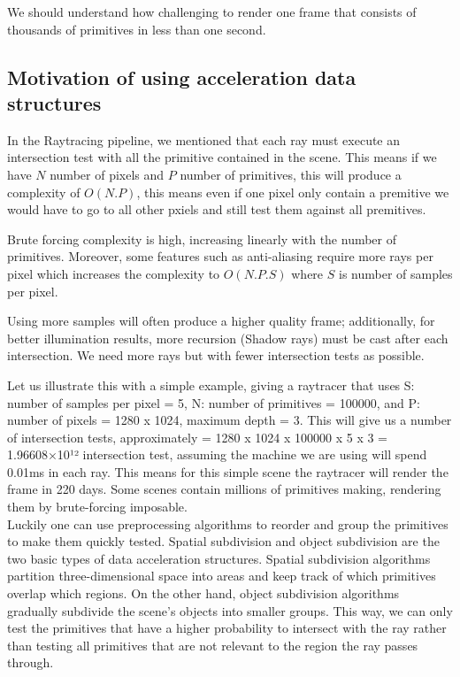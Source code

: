 \documentclass[11pt,a4paper]{article}
\begin{document}
We should understand how challenging to render one frame that consists of thousands of primitives in less than one second. 

\subsection{Motivation of using acceleration data structures}
In the Raytracing pipeline, we mentioned that each ray must execute an intersection test with all the primitive contained in the scene.  This means if we have $N$ number of pixels and $P$ number of primitives, this will produce a complexity of $O(N.P)$, this means even if one pixel only contain a premitive we would have to go to all other pxiels and still test them against all premitives. 

Brute forcing complexity is high, increasing linearly with the number of primitives. Moreover, some features such as anti-aliasing require more rays per pixel which increases the complexity to  $O(N.P.S)$ where $S$ is number of samples per pixel. 

Using more samples will often produce a higher quality frame; additionally, for better illumination results, more recursion (Shadow rays) must be cast after each intersection. We need more rays but with fewer intersection tests as possible.

Let us illustrate this with a simple example, giving a raytracer that uses S: number of samples per pixel = 5, N: number of primitives = 100000, and P: number of pixels =  1280 x 1024, maximum depth = 3. This will give us a number of intersection tests, approximately = 1280 x 1024 x 100000 x 5 x 3 = 1.96608×10¹² intersection test, assuming the machine we are using will spend 0.01ms in each ray. This means for this simple scene the raytracer will render the frame in 220 days. Some scenes contain millions of primitives making, rendering them by brute-forcing imposable. 
\\ 
Luckily one can use preprocessing algorithms to reorder and group the primitives to make them quickly tested. Spatial subdivision and object subdivision are the two basic types of data acceleration structures. Spatial subdivision algorithms partition three-dimensional space into areas and keep track of which primitives overlap which regions. On the other hand, object subdivision algorithms gradually subdivide the scene's objects into smaller groups. This way, we can only test the primitives that have a higher probability to intersect with the ray rather than testing all primitives that are not relevant to the region the ray passes through. 
\end{document}
